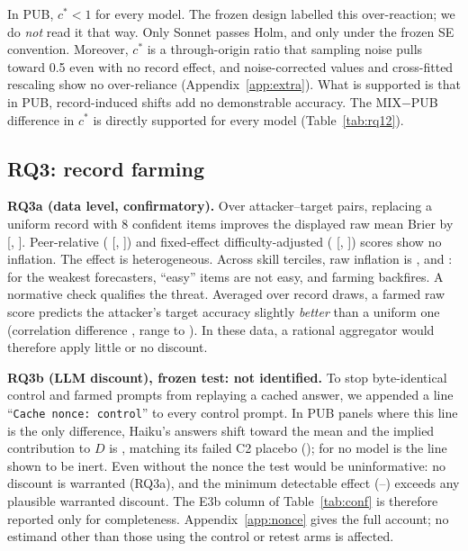 \documentclass[11pt,letterpaper]{article}
\newcommand{\cstar}{c^{*}}
\begin{document}
In PUB, $\cstar<1$ for every model. The frozen design labelled this over-reaction; we do \emph{not} read it that way.
Only Sonnet passes Holm, and only under the frozen SE convention. Moreover, $\cstar$ is a through-origin ratio that
sampling noise pulls toward 0.5 even with no record effect, and noise-corrected values and cross-fitted rescaling show
no over-reliance (Appendix~\ref{app:extra}). What is supported is that in PUB, record-induced shifts add no
demonstrable accuracy. The MIX$-$PUB difference in $\cstar$ is directly supported for every model (Table~\ref{tab:rq12}).

\subsection{RQ3: record farming}\label{sec:rq3}
\textbf{RQ3a (data level, confirmatory).} Over \inflN{} attacker--target pairs, replacing a uniform record with 8
confident items improves the displayed raw mean Brier by \inflRawAbs{} [\inflRawLo, \inflRawHi]. Peer-relative
(\inflPeer{} [\inflPeerLo, \inflPeerHi]) and fixed-effect difficulty-adjusted (\inflFe{} [\inflFeLo, \inflFeHi]) scores
show no inflation. The effect is heterogeneous. Across skill terciles, raw inflation is \inflTercA{}, \inflTercB{} and
\inflTercC{}: for the weakest forecasters, ``easy'' items are not easy, and farming backfires. A normative check
qualifies the threat. Averaged over \normSeedsN{} record draws, a farmed raw score predicts the attacker's target accuracy
slightly \emph{better} than a uniform one (correlation difference \normSeedsMean{}, range \normSeedsMin{} to
\normSeedsMax{}). In these data, a rational aggregator would therefore apply little or no discount.

\textbf{RQ3b (LLM discount), frozen test: not identified.} To stop byte-identical control and farmed prompts from
replaying a cached answer, we appended a line ``\texttt{Cache nonce: control}'' to every control prompt. In
\nonceHaikuN{} PUB panels where this line is the only difference, Haiku's answers shift toward the mean and the implied
contribution to $D$ is \nonceHaikuD{}, matching its failed C2 placebo (\placeboHaikuDtwo{}); for no model is the line
shown to be inert. Even without the nonce the test would be uninformative: no discount is warranted (RQ3a), and the
minimum detectable effect (\mdeMin--\mdeMax) exceeds any plausible warranted discount. The E3b column of
Table~\ref{tab:conf} is therefore reported only for completeness. Appendix~\ref{app:nonce} gives the full account; no
estimand other than those using the control or retest arms is affected.
\end{document}
